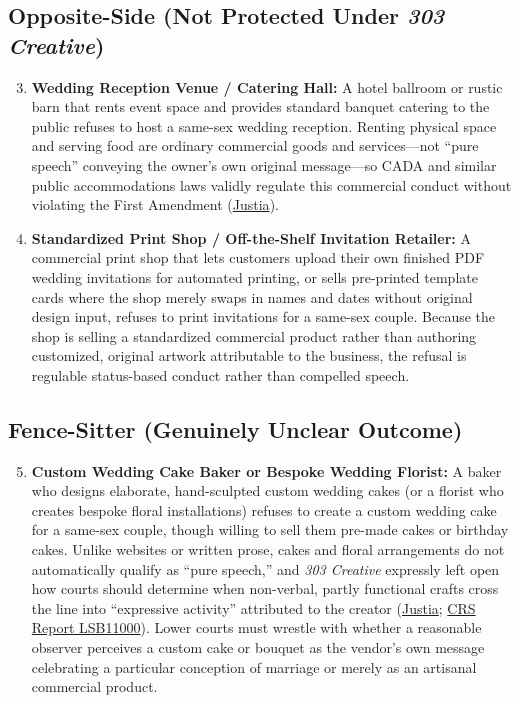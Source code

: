 \documentclass[12pt]{article}
\begin{document}
\subsection*{Opposite-Side (Not Protected Under \textit{303 Creative})}
\begin{enumerate}
  \setcounter{enumi}{2}
  \item \textbf{Wedding Reception Venue / Catering Hall:} A hotel ballroom or rustic barn that rents event space and provides standard banquet catering to the public refuses to host a same-sex wedding reception. Renting physical space and serving food are ordinary commercial goods and services---not ``pure speech'' conveying the owner's own original message---so CADA and similar public accommodations laws validly regulate this commercial conduct without violating the First Amendment (\href{https://supreme.justia.com/cases/federal/us/600/21-476/}{Justia}).
  \item \textbf{Standardized Print Shop / Off-the-Shelf Invitation Retailer:} A commercial print shop that lets customers upload their own finished PDF wedding invitations for automated printing, or sells pre-printed template cards where the shop merely swaps in names and dates without original design input, refuses to print invitations for a same-sex couple. Because the shop is selling a standardized commercial product rather than authoring customized, original artwork attributable to the business, the refusal is regulable status-based conduct rather than compelled speech.
\end{enumerate}

\subsection*{Fence-Sitter (Genuinely Unclear Outcome)}
\begin{enumerate}
  \setcounter{enumi}{4}
  \item \textbf{Custom Wedding Cake Baker or Bespoke Wedding Florist:} A baker who designs elaborate, hand-sculpted custom wedding cakes (or a florist who creates bespoke floral installations) refuses to create a custom wedding cake for a same-sex couple, though willing to sell them pre-made cakes or birthday cakes. Unlike websites or written prose, cakes and floral arrangements do not automatically qualify as ``pure speech,'' and \textit{303 Creative} expressly left open how courts should determine when non-verbal, partly functional crafts cross the line into ``expressive activity'' attributed to the creator (\href{https://supreme.justia.com/cases/federal/us/600/21-476/}{Justia}; \href{https://www.everycrsreport.com/reports/LSB11000.html}{CRS Report LSB11000}). Lower courts must wrestle with whether a reasonable observer perceives a custom cake or bouquet as the vendor's own message celebrating a particular conception of marriage or merely as an artisanal commercial product.
\end{enumerate}
\end{document}

